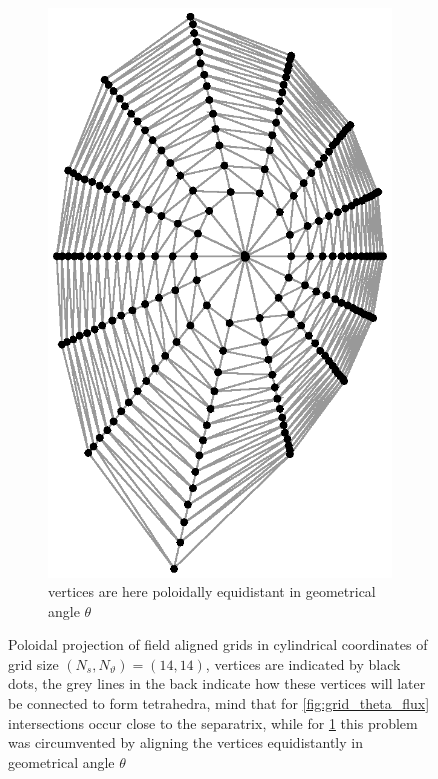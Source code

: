 \documentclass[./main.tex]{subfiles}
\begin{document}
\begin{figure}[ht!]
\begin{subfigure}[b]{0.45\textwidth}
		\includegraphics[width=1.0\textwidth]{figures/grid_geom_theta_meshed.eps}
		\captionsetup{width=1\textwidth}
		\caption{vertices are here poloidally equidistant in geometrical angle $\theta$}
		\label{fig:grid_theta_geom}
	\end{subfigure}\hfill
		\caption{Poloidal projection of field aligned grids in cylindrical coordinates of grid size $(N_s,N_\vartheta) = (14,14)$, vertices are indicated by black dots, the grey lines in the back indicate how these vertices will later be connected to form tetrahedra, mind that for \ref{fig:grid_theta_flux} intersections occur close to the separatrix, while for \ref{fig:grid_theta_geom} this problem was circumvented by aligning the vertices equidistantly in geometrical angle $\theta$}
\label{fig:grid_theta_flux_geom}
\end{figure}
\end{document}
